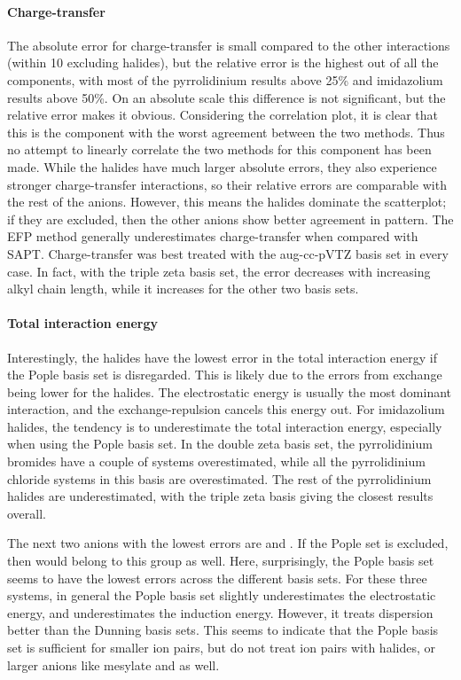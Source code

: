 \begin{footnotesize}
\paragraph{Charge-transfer}
The absolute error for charge-transfer is small compared to the other interactions (within 10 \enUnit excluding halides), but the relative error is the highest out of all the components, with most of the pyrrolidinium results above 25\% and imidazolium results above 50\%.
On an absolute scale this difference is not significant, but the relative error makes it obvious.
Considering the correlation plot, it is clear that this is the component with the worst agreement between the two methods.
Thus no attempt to linearly correlate the two methods for this component has been made.
While the halides have much larger absolute errors, they also experience stronger charge-transfer interactions, so their relative errors are comparable with the rest of the anions.
However, this means the halides dominate the scatterplot; if they are excluded, then the other anions show better agreement in pattern.
The EFP method generally underestimates charge-transfer when compared with SAPT.
Charge-transfer was best treated with the aug-cc-pVTZ basis set in every case.
In fact, with the triple zeta basis set, the error decreases with increasing alkyl chain length, while it increases for the other two basis sets.


\paragraph{Total interaction energy}
Interestingly, the halides have the lowest error in the total interaction energy if the Pople basis set is disregarded.
This is likely due to the errors from exchange being lower for the halides.
The electrostatic energy is usually the most dominant interaction, and the exchange-repulsion cancels this energy out.
For imidazolium halides, the tendency is to underestimate the total interaction energy, especially when using the Pople basis set.
In the double zeta basis set, the pyrrolidinium bromides have a couple of systems overestimated, while all the pyrrolidinium chloride systems in this basis are overestimated.
The rest of the pyrrolidinium halides are underestimated, with the triple zeta basis giving the closest results overall.


The next two anions with the lowest errors are \dca and \bfl. 
If the Pople set is excluded, then \pf would belong to this group as well.
Here, surprisingly, the Pople basis set seems to have the lowest errors across the different basis sets.
For these three systems, in general the Pople basis set slightly underestimates the electrostatic energy, and underestimates the induction energy.
However, it treats dispersion better than the Dunning basis sets.
This seems to indicate that the Pople basis set is sufficient for smaller ion pairs, but do not treat ion pairs with halides, or larger anions like mesylate and \ntf as well.



\end{footnotesize}
